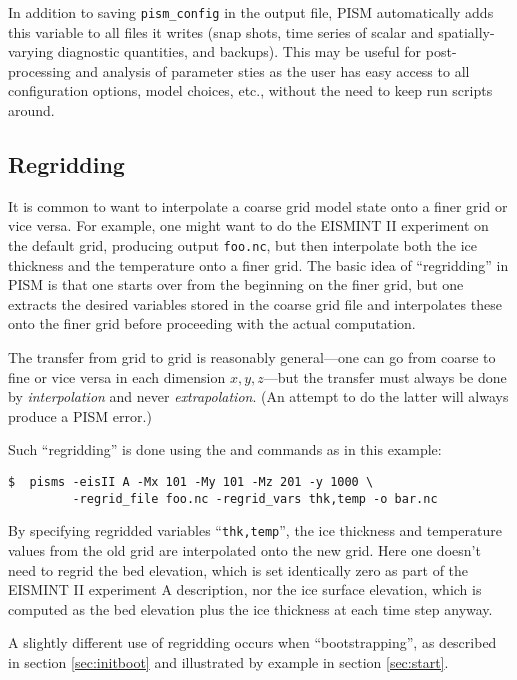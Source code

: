 In addition to saving \texttt{pism_config} in the output file, PISM automatically adds this  variable to all files it writes (snap shots, time series of scalar and spatially-varying diagnostic quantities, and backups). This may be useful for post-processing and analysis of parameter sties as the user has easy access to all configuration options, model choices, etc., without the need to keep run scripts around.

\subsection{Regridding}
\label{sec:regridding}

It is common to want to interpolate a coarse grid model state onto a finer grid or vice versa.  For example, one might want to do the EISMINT II experiment on the default grid, producing output \texttt{foo.nc}, but then interpolate both the ice thickness and the temperature onto a finer grid.  The basic idea of ``regridding'' in PISM is that one starts over from the beginning on the finer grid, but one extracts the desired variables stored in the coarse grid file and interpolates these onto the finer grid before proceeding with the actual computation.

The transfer from grid to grid is reasonably general---one can go from coarse to fine or vice versa in each dimension $x,y,z$---but the transfer must always be done by \emph{interpolation} and never \emph{extrapolation}.  (An attempt to do the latter will always produce a PISM error.)

Such ``regridding'' is done using the  and
 commands as in this example: 

\begin{verbatim}
$  pisms -eisII A -Mx 101 -My 101 -Mz 201 -y 1000 \
         -regrid_file foo.nc -regrid_vars thk,temp -o bar.nc
\end{verbatim}
\noindent By specifying regridded variables ``\texttt{thk,temp}'', the ice thickness and temperature values from the old grid are interpolated onto the new grid.  Here one doesn't need to regrid the bed elevation, which is set identically zero as part of the EISMINT II experiment A description, nor the ice surface elevation, which is computed as the bed elevation plus the ice thickness at each time step anyway.

A slightly different use of regridding occurs when ``bootstrapping'', as described in section \ref{sec:initboot} and illustrated by example in section \ref{sec:start}.

